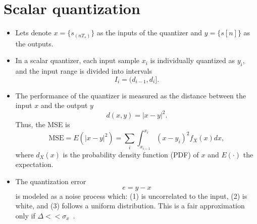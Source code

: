 \section{Scalar quantization}
\begin{itemize}
\item Lets denote $x=\{s_(nT_s)\}$ as the inputs of the quantizer and
  $y=\{s[n]\}$ as the outputs.

\item In a scalar quantizer, each input sample $x_i$ is individually
  quantized as $y_i$, and the input range is divided into intervals
  \begin{equation}
    I_i=(d_{i-1}, d_i].
  \end{equation}
  
\item The performance of the quantizer is measured as the distance
  between the input $x$ and the output $y$
  \begin{equation*}
    d(x,y) = |x-y|^2.
  \end{equation*}
  Thus, the MSE is
  \begin{equation}
    \text{MSE} = E(|x-y|^2)=\sum_i\int_{x_{i-1}}^{x_i} (x-y_i)^2f_X(x)dx,
  \end{equation}
  where $d_X(x)$ is the probability density function (PDF) of $x$ and
  $E(\cdot)$ the expectation.

\item The quantization error
  \begin{equation}
    e=y-x
  \end{equation}
  is modeled as a noise process
  which: (1) is uncorrelated to the input, (2) is white, and (3)
  follows a uniform distribution. This is a fair approximation only if
  $\Delta<<\sigma_x$~\cite{vetterli1995wavelets}.

\end{itemize}

